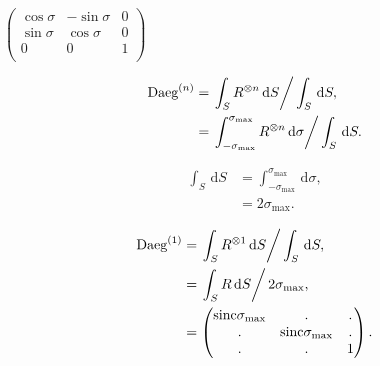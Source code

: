 \documentclass[a4paper,11pt,twoside,openright]{book}
\providecommand{\sinc}{{\mathrm{sinc}}}%
\def\lthtmlcheckvsize{\ifdim\ht\sizebox<\vsize 
  \ifdim\wd\sizebox<\hsize\expandafter\hfill\fi \expandafter\vfill
  \else\expandafter\vss\fi}%
\begin{document}
{\newpage\clearpage
{}%
$\displaystyle \begin{pmatrix}
\cos\sigma & -\sin\sigma & 0 \\
\sin\sigma & \cos\sigma  & 0 \\
0          & 0           & 1 \\
\end{pmatrix}$%
\lthtmlindisplaymathZ
\lthtmlcheckvsize\clearpage}

{\newpage\clearpage
\setcounter{equation}{10}
%
\begin{subequations}\begin{align}
\textrm{Daeg}^{(n)}&= \left. \int_S R^{\otimes n} \,\mathrm{d}S \right / \int_S \,\mathrm{d}S, \\
&= \left. \int_{-\sigma_{\textrm{max}}}^{\sigma_{\textrm{max}}} R^{\otimes n} \,\mathrm{d}\sigma  \right / \int_S \,\mathrm{d}S.
\end{align}\end{subequations}%
\lthtmldisplayZ
\lthtmlcheckvsize\clearpage}

{\newpage\clearpage
\setcounter{equation}{11}
%
\begin{subequations}\begin{align}
\int_S \,\mathrm{d}S &= \int_{-\sigma_{\textrm{max}}}^{\sigma_{\textrm{max}}} \,\mathrm{d}\sigma , \\
&= 2\sigma_{\textrm{max}}.
\end{align}\end{subequations}%
\lthtmldisplayZ
\lthtmlcheckvsize\clearpage}

{\newpage\clearpage
\setcounter{equation}{12}
%
\begin{subequations}\begin{align}
\textrm{Daeg}^{(1)}&= \left. \int_S R^{\otimes 1} \,\mathrm{d}S \right / \int_S \,\mathrm{d}S, \\
&= \left. \int_S R \,\mathrm{d}S \right / 2\sigma_{\textrm{max}}, \\
&= \begin{pmatrix}
\sinc \sigma_{\textrm{max}}& .              & . \\
.              & \sinc \sigma_{\textrm{max}}& . \\
.              & .              & 1 \\
\end{pmatrix} .
\end{align}\end{subequations}%
\lthtmldisplayZ
\lthtmlcheckvsize\clearpage}
\end{document}

